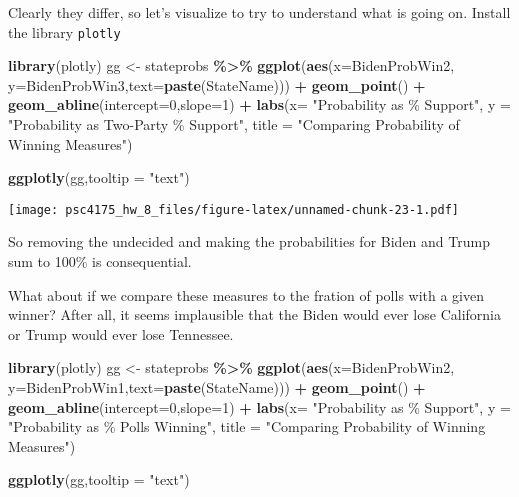 \documentclass[
]{article}
\newenvironment{Shaded}{\begin{snugshade}}{\end{snugshade}}
\newcommand{\AttributeTok}[1]{\textcolor[rgb]{0.13,0.29,0.53}{#1}}
\newcommand{\DecValTok}[1]{\textcolor[rgb]{0.00,0.00,0.81}{#1}}
\newcommand{\FunctionTok}[1]{\textcolor[rgb]{0.13,0.29,0.53}{\textbf{#1}}}
\newcommand{\NormalTok}[1]{#1}
\newcommand{\OtherTok}[1]{\textcolor[rgb]{0.56,0.35,0.01}{#1}}
\newcommand{\SpecialCharTok}[1]{\textcolor[rgb]{0.81,0.36,0.00}{\textbf{#1}}}
\newcommand{\StringTok}[1]{\textcolor[rgb]{0.31,0.60,0.02}{#1}}
\begin{document}
Clearly they differ, so let's visualize to try to understand what is
going on. Install the library \texttt{plotly}

\begin{Shaded}
\begin{Highlighting}[]
\FunctionTok{library}\NormalTok{(plotly)}
\NormalTok{gg }\OtherTok{\textless{}{-}}\NormalTok{ stateprobs }\SpecialCharTok{\%\textgreater{}\%}
  \FunctionTok{ggplot}\NormalTok{(}\FunctionTok{aes}\NormalTok{(}\AttributeTok{x=}\NormalTok{BidenProbWin2, }\AttributeTok{y=}\NormalTok{BidenProbWin3,}\AttributeTok{text=}\FunctionTok{paste}\NormalTok{(StateName))) }\SpecialCharTok{+}
  \FunctionTok{geom\_point}\NormalTok{() }\SpecialCharTok{+}
  \FunctionTok{geom\_abline}\NormalTok{(}\AttributeTok{intercept=}\DecValTok{0}\NormalTok{,}\AttributeTok{slope=}\DecValTok{1}\NormalTok{) }\SpecialCharTok{+}
  \FunctionTok{labs}\NormalTok{(}\AttributeTok{x=} \StringTok{"Probability as \% Support"}\NormalTok{,}
       \AttributeTok{y =} \StringTok{"Probability as Two{-}Party \% Support"}\NormalTok{,}
       \AttributeTok{title =} \StringTok{"Comparing Probability of Winning Measures"}\NormalTok{)}

\FunctionTok{ggplotly}\NormalTok{(gg,}\AttributeTok{tooltip =} \StringTok{"text"}\NormalTok{)}
\end{Highlighting}
\end{Shaded}

\texttt{[image: psc4175\_hw\_8\_files/figure-latex/unnamed-chunk-23-1.pdf]}

So removing the undecided and making the probabilities for Biden and
Trump sum to 100\% is consequential.

What about if we compare these measures to the fration of polls with a
given winner? After all, it seems implausible that the Biden would ever
lose California or Trump would ever lose Tennessee.

\begin{Shaded}
\begin{Highlighting}[]
\FunctionTok{library}\NormalTok{(plotly)}
\NormalTok{gg }\OtherTok{\textless{}{-}}\NormalTok{ stateprobs }\SpecialCharTok{\%\textgreater{}\%}
  \FunctionTok{ggplot}\NormalTok{(}\FunctionTok{aes}\NormalTok{(}\AttributeTok{x=}\NormalTok{BidenProbWin2, }\AttributeTok{y=}\NormalTok{BidenProbWin1,}\AttributeTok{text=}\FunctionTok{paste}\NormalTok{(StateName))) }\SpecialCharTok{+}
  \FunctionTok{geom\_point}\NormalTok{() }\SpecialCharTok{+}
  \FunctionTok{geom\_abline}\NormalTok{(}\AttributeTok{intercept=}\DecValTok{0}\NormalTok{,}\AttributeTok{slope=}\DecValTok{1}\NormalTok{) }\SpecialCharTok{+}
  \FunctionTok{labs}\NormalTok{(}\AttributeTok{x=} \StringTok{"Probability as \% Support"}\NormalTok{,}
       \AttributeTok{y =} \StringTok{"Probability as \% Polls Winning"}\NormalTok{,}
       \AttributeTok{title =} \StringTok{"Comparing Probability of Winning Measures"}\NormalTok{)}

\FunctionTok{ggplotly}\NormalTok{(gg,}\AttributeTok{tooltip =} \StringTok{"text"}\NormalTok{)}
\end{Highlighting}
\end{Shaded}
\end{document}
